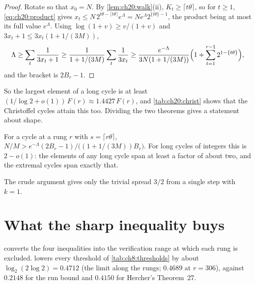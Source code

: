 \begin{proof}
Rotate so that $x_0=N$. By \cref{lem:ch20:walk}(ii), $K_t\ge\lceil t\theta\rceil$, so for $t\ge1$, \eqref{eq:ch20:product} gives $x_t\le N\,2^{t\theta-\lceil t\theta\rceil}e^{\Lambda}=N e^{\Lambda}2^{\{t\theta\}-1}$, the product being at most its full value $e^\Lambda$. Using $\log(1+v)\ge v/(1+v)$ and $3x_t+1\le3x_t(1+1/(3M))$,
\[
\Lambda\ge\sum_t\frac{1}{3x_t+1}\ge\frac{1}{1+1/(3M)}\sum_t\frac{1}{3x_t}\ge\frac{e^{-\Lambda}}{3N(1+1/(3M))}\Bigl(1+\sum_{t=1}^{r-1}2^{1-\{t\theta\}}\Bigr),
\]
and the bracket is $2B_r-1$.
\end{proof}

So the largest element of a long cycle is at least $(1/\log2+o(1))\,F(r)\approx1.4427\,F(r)$, and \cref{tab:ch20:christ} shows that the Christoffel cycles attain this too. Dividing the two theorems gives a statement about shape.

\begin{corollary}[Spread]\label{cor:ch20:spread}
For a cycle at a rung $r$ with $s=\lceil r\theta\rceil$, $N/M>e^{-\Lambda}(2B_r-1)/\bigl((1+1/(3M))B_r\bigr)$. For long cycles of integers this is $2-o(1)$: the elements of any long cycle span at least a factor of about two, and the extremal cycles span exactly that.
\end{corollary}

The crude argument gives only the trivial spread $3/2$ from a single step with $k=1$.

\section{What the sharp inequality buys}\label{sec:ch20:buys}

 converts the four inequalities into the verification range at which each rung is excluded.  lowers every threshold of \cref{tab:ch8:thresholds} by about $\log_2(2\log2)=0.4712$ (the limit along the rungs; $0.4689$ at $r=306$), against $0.2148$ for the run bound and $0.4150$ for Hercher's Theorem~27.


